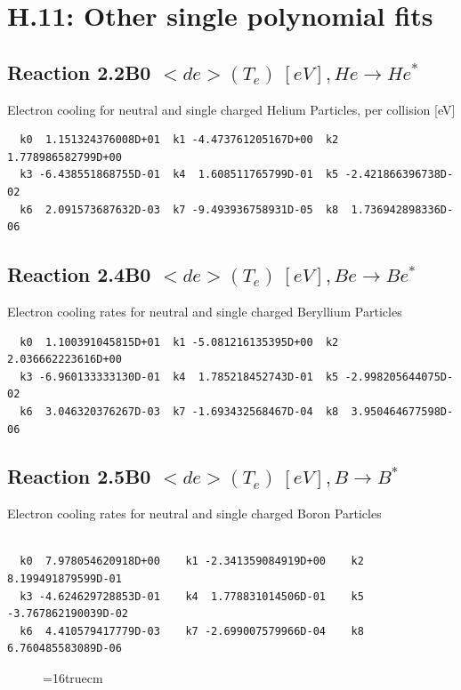 \documentclass[12pt,dvips]{article}
\begin{document}
\section{H.11: Other single polynomial fits}

\subsection{
Reaction 2.2B0   $ <de>(T_e) \ [eV], He \rightarrow He^* $
}

  Electron cooling for neutral and single
  charged Helium Particles, per collision [eV]

\begin{small}\begin{verbatim}
  k0  1.151324376008D+01  k1 -4.473761205167D+00  k2  1.778986582799D+00
  k3 -6.438551868755D-01  k4  1.608511765799D-01  k5 -2.421866396738D-02
  k6  2.091573687632D-03  k7 -9.493936758931D-05  k8  1.736942898336D-06

\end{verbatim}\end{small}


\subsection{
Reaction 2.4B0  $  <de>(T_e)  \ [eV], Be \rightarrow Be^*$
}

  Electron cooling rates for neutral and single
  charged Beryllium Particles

\begin{small}\begin{verbatim}
  k0  1.100391045815D+01  k1 -5.081216135395D+00  k2  2.036662223616D+00
  k3 -6.960133333130D-01  k4  1.785218452743D-01  k5 -2.998205644075D-02
  k6  3.046320376267D-03  k7 -1.693432568467D-04  k8  3.950464677598D-06

\end{verbatim}\end{small}
\subsection{
Reaction 2.5B0   $ <de>(T_e) \ [eV], B \rightarrow B^* $
}

 Electron cooling rates for neutral and single
 charged Boron Particles

\begin{small}\begin{verbatim}

  k0  7.978054620918D+00    k1 -2.341359084919D+00    k2  8.199491879599D-01
  k3 -4.624629728853D-01    k4  1.778831014506D-01    k5 -3.767862190039D-02
  k6  4.410579417779D-03    k7 -2.699007579966D-04    k8  6.760485583089D-06

\end{verbatim}\end{small}
\begin{figure} \label{2.5ll}
\epsfxsize=16truecm
\end{figure}
\newpage
\end{document}
